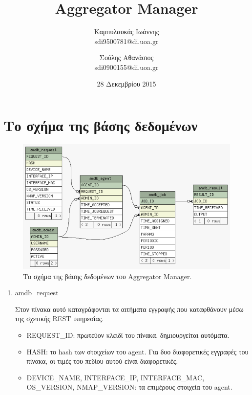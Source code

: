 \documentclass[a4paper,11pt]{article}
\title{Aggregator Manager}
\author{Καμπυλαυκάς Ιωάννης \\ sdi9500781@di.uoa.gr \and Σούλης Αθανάσιος \\ sdi0900155@di.uoa.gr}
\date{28 Δεκεμβρίου 2015}
\begin{document}
\begin{sloppypar}

\maketitle

\tableofcontents

\newpage


\section{Το σχήμα της βάσης δεδομένων}



\begin{figure}[h]
\includegraphics[width=\textwidth]{schema}
\centering
\caption{Το σχήμα της βάσης δεδομένων του Aggregator Manager.}
\end{figure}



\begin{enumerate}


\item amdb\_request

Στον πίνακα αυτό καταγράφονται τα αιτήματα εγγραφής που καταφθάνουν μέσω της σχετικής REST υπηρεσίας.
\begin{itemize}

\item REQUEST\_ID: πρωτεύον κλειδί του πίνακα, δημιουργείται αυτόματα.

\item HASH: το hash των στοιχείων του agent. Για δυο διαφορετικές εγγραφές του πίνακα, οι τιμές του πεδίου αυτού είναι διαφορετικές.

\item DEVICE\_NAME, INTERFACE\_IP, INTERFACE\_MAC, OS\_VERSION, NMAP\_VERSION: τα επιμέρους στοιχεία του agent.


\end{itemize}
\end{enumerate}
\end{sloppypar}
\end{document}
